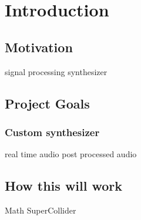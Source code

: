 \chapter{Introduction}\label{intro}

\section[Motivation]{Motivation}\label{motivation}
signal processing
synthesizer

\section[Short name]{Project Goals}\label{projectGoals}
\subsection[Custom synthesizer]{Custom synthesizer}\label{}
real time audio
post processed audio

\section[How this will work]{How this will work}\label{}
Math
SuperCollider
